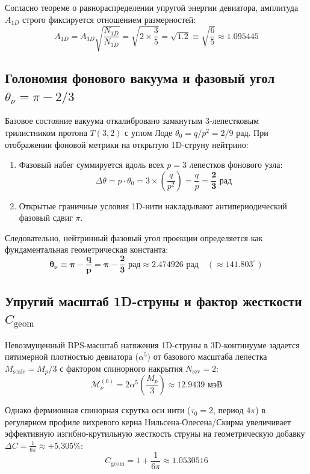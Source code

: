 \documentclass[12pt,a4paper]{article}
\begin{document}
Согласно теореме о равнораспределении упругой энергии девиатора, амплитуда $A_{1D}$ строго фиксируется отношением размерностей:
\begin{equation}
	A_{1D} = A_{3D} \sqrt{\frac{N_{1D}}{N_{3D}}} = \sqrt{2 \times \frac{3}{5}} = \mathbf{\sqrt{1.2}} \equiv \sqrt{\frac{6}{5}} \approx 1.095445
\end{equation}

\subsection{Голономия фонового вакуума и фазовый угол $\theta_\nu = \pi - 2/3$}
Базовое состояние вакуума откалибровано замкнутым 3-лепестковым трилистником протона $T(3,2)$ с углом Лоде $\theta_0 = q/p^2 = 2/9$ рад. При отображении фоновой метрики на открытую 1D-струну нейтрино:
\begin{enumerate}
	\item Фазовый набег суммируется вдоль всех $p=3$ лепестков фонового узла: 
	\begin{equation}
		\Delta \theta = p \cdot \theta_0 = 3 \times \left(\frac{q}{p^2}\right) = \frac{q}{p} = \mathbf{\frac{2}{3} \text{ рад}}
	\end{equation}
	\item Открытые граничные условия 1D-нити накладывают антипериодический фазовый сдвиг $\pi$.
\end{enumerate}
Следовательно, нейтринный фазовый угол проекции определяется как фундаментальная геометрическая константа:
\begin{equation}
	\mathbf{\theta_\nu \equiv \pi - \frac{q}{p} = \pi - \frac{2}{3} \text{ рад}} \approx \mathbf{2.474926 \text{ рад}} \quad (\approx 141.803^\circ)
\end{equation}

\subsection{Упругий масштаб 1D-струны и фактор жесткости $C_{\text{geom}}$}
Невозмущенный BPS-масштаб натяжения 1D-струны в 3D-континууме задается пятимерной плотностью девиатора ($\alpha^5$) от базового масштаба лепестка $M_{\text{scale}} = M_p/3$ с фактором спинорного накрытия $N_{\text{rev}} = 2$:
\begin{equation}
	\mathcal{M}_\nu^{(0)} = 2 \alpha^5 \left( \frac{M_p}{3} \right) \approx 12.9439 \text{ мэВ}
\end{equation}

Однако фермионная спинорная скрутка оси нити ($\tau_0 = 2$, период $4\pi$) в регулярном профиле вихревого керна Нильсена-Олесена/Скирма увеличивает эффективную изгибно-крутильную жесткость струны на геометрическую добавку $\Delta C = \frac{1}{6\pi} \approx +5.305\%$:
\begin{equation}
	C_{\text{geom}} = 1 + \frac{1}{6\pi} \approx \mathbf{1.0530516}
\end{equation}
\end{document}
